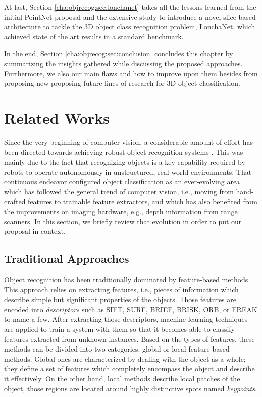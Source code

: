 At last, Section \ref{cha:objrecog:sec:lonchanet} takes all the lessons learned from the initial PointNet proposal and the extensive study to introduce a novel slice-based architecture to tackle the 3D object class recognition problem, LonchaNet, which achieved state of the art results in a standard benchmark.

In the end, Section \ref{cha:objrecog:sec:conclusion} concludes this chapter by summarizing the insights gathered while discussing the proposed approaches. Furthermore, we also our main flaws and how to improve upon them besides from proposing new proposing future lines of research for 3D object classification.

\section{Related Works}
\label{cha:objrecog:sec:relatedworks}

Since the very beginning of computer vision, a considerable amount of effort has been directed towards achieving robust object recognition systems \cite{Andreopoulos2013}. This was mainly due to the fact that recognizing objects is a key capability required by robots to operate autonomously in unstructured, real-world environments. That continuous endeavor configured object classification as an ever-evolving area which has followed the general trend of computer vision, i.e., moving from hand-crafted features to trainable feature extractors, and which has also benefited from the improvements on imaging hardware, e.g., depth information from range scanners. In this section, we briefly review that evolution in order to put our proposal in context.

\subsection{Traditional Approaches}
\label{cha:objrecog:sec:relatedworks:subsec:traditional}

Object recognition has been traditionally dominated by feature-based methods. This approach relies on extracting features, i.e., pieces of information which describe simple but significant properties of the objects. Those features are encoded into \emph{descriptors} such as \ac{SIFT}\cite{Lowe2004}, \ac{SURF}\cite{Bay2006}, \ac{BRIEF}\cite{Calonder2010}, \ac{BRISK}\cite{Leutenegger2011}, \ac{ORB}\cite{Rublee2011}, or \ac{FREAK}\cite{Alahi2012} to name a few. After extracting those descriptors, machine learning techniques are applied to train a system with them so that it becomes able to classify features extracted from unknown instances. Based on the types of features, these methods can be divided into two categories: global or local feature-based methods. Global ones are characterized by dealing with the object as a whole; they define a set of features which completely encompass the object and describe it effectively. On the other hand, local methods describe local patches of the object, those regions are located around highly distinctive spots named \emph{keypoints}. 

